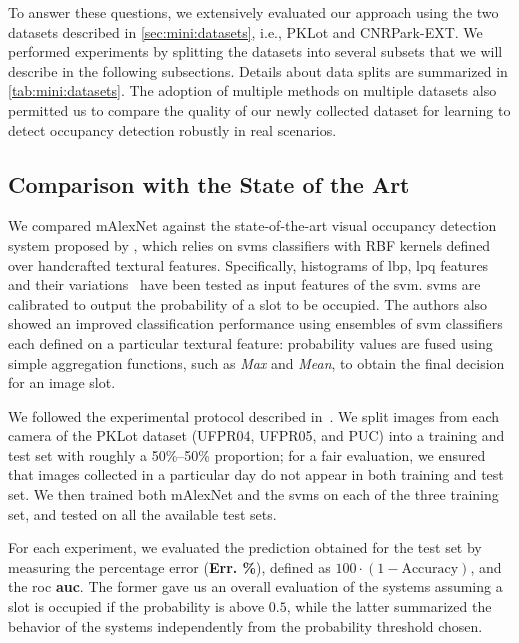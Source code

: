 To answer these questions, we extensively evaluated our approach using the two datasets described in \ref{sec:mini:datasets}, i.e., PKLot and CNRPark-EXT.
We performed experiments by splitting the datasets into several subsets that we will describe in the following subsections.
Details about data splits are summarized in \ref{tab:mini:datasets}.
The adoption of multiple methods on multiple datasets also permitted us to compare the quality of our newly collected dataset for learning to detect occupancy detection robustly in real scenarios.

\subsection{Comparison with the State of the Art}
\label{sub:mini:sota}

We compared mAlexNet against the state-of-the-art visual occupancy detection system proposed by \citet{de2015pklot}, which relies on \glspl{svm} classifiers with RBF kernels defined over handcrafted textural features.
Specifically, histograms of \gls{lbp}, \gls{lpq} features and their variations~\cite{ojala2002multiresolution, ojansivu2008blur, rahtu2012local} have been tested as input features of the \gls{svm}.
\Glspl{svm} are calibrated to output the probability of a slot to be occupied.
The authors also showed an improved classification performance  using ensembles of \gls{svm} classifiers each defined on a particular textural feature:
probability values are fused using simple aggregation functions, such as \emph{Max} and \emph{Mean}, to obtain the final decision for an image slot.

We followed the experimental protocol described in~\cite{de2015pklot}.
We split images from each camera of the PKLot dataset (UFPR04, UFPR05, and PUC) into a training and test set with roughly a 50\%--50\% proportion;
for a fair evaluation, we ensured that images collected in a particular day do not appear in both training and test set.
We then trained both mAlexNet and the \glspl{svm} on each of the three training set, and tested on all the available test sets.
%

For each experiment, we evaluated the prediction obtained for the test set by measuring the percentage error (\textbf{Err. \%}), defined as $100 \cdot (1 - \text{Accuracy})$, and the \gls{roc} \textbf{\gls{auc}}.
The former gave us an overall evaluation of the systems assuming a slot is occupied if the probability is above $0.5$, while the latter summarized the behavior of the systems independently from the probability threshold chosen.


